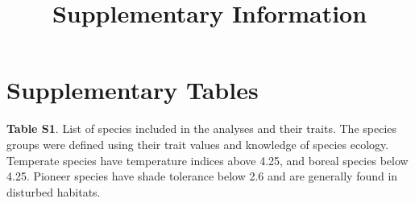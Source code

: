 \documentclass[
]{article}
\title{Supplementary Information}
\date{}
\begin{document}
\maketitle

\hypertarget{supplementary-tables}{%
\section{Supplementary Tables}\label{supplementary-tables}}

\textbf{Table S1}. List of species included in the analyses and their
traits. The species groups were defined using their trait values and
knowledge of species ecology. Temperate species have temperature indices
above 4.25, and boreal species below 4.25. Pioneer species have shade
tolerance below 2.6 and are generally found in disturbed habitats.
\end{document}
